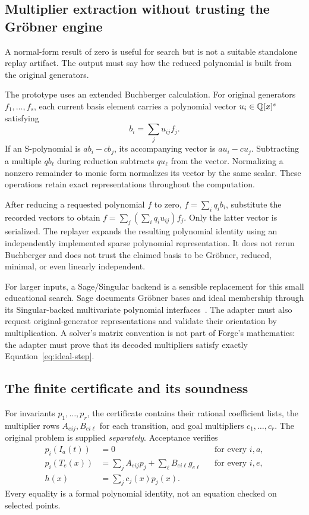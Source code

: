 \subsection{Multiplier extraction without trusting the Gr\"obner engine}

A normal-form result of zero is useful for search but is not a suitable
standalone replay artifact. The output must say how the reduced polynomial is
built from the original generators.

The prototype uses an extended Buchberger calculation. For original generators
$f_1,\ldots,f_s$, each current basis element carries a polynomial vector
$u_i\in\mathbb{Q}[x]^s$ satisfying
\[
 b_i=\sum_j u_{ij}f_j.
\]
If an S-polynomial is $a b_i-c b_j$, its accompanying vector is
$a u_i-c u_j$. Subtracting a multiple $q b_\ell$ during reduction subtracts
$q u_\ell$ from the vector. Normalizing a nonzero remainder to monic form
normalizes its vector by the same scalar. These operations retain exact
representations throughout the computation.

After reducing a requested polynomial $f$ to zero,
$f=\sum_i q_i b_i$, substitute the recorded vectors to obtain
$f=\sum_j(\sum_i q_i u_{ij})f_j$. Only the latter vector is serialized. The
replayer expands the resulting polynomial identity using an independently
implemented sparse polynomial representation. It does not rerun Buchberger and
does not trust the claimed basis to be Gr\"obner, reduced, minimal, or even
linearly independent.

For larger inputs, a Sage/Singular backend is a sensible replacement for this
small educational search. Sage documents Gr\"obner bases and ideal membership
through its Singular-backed multivariate polynomial interfaces~\cite{sage-ideals}.
The adapter must also request original-generator representations and validate
their orientation by multiplication. A solver's matrix convention is not part
of Forge's mathematics: the adapter must prove that its decoded multipliers
satisfy exactly Equation~\eqref{eq:ideal-step}.

\subsection{The finite certificate and its soundness}

For invariants $p_1,\ldots,p_r$, the certificate contains their rational
coefficient lists, the multiplier rows $A_{eij},B_{ei\ell}$ for each transition,
and goal multipliers $c_1,\ldots,c_r$. The original problem is supplied
\emph{separately}. Acceptance verifies
\begin{align}
 p_i(I_a(t))&=0 &&\text{for every }i,a,\label{eq:ideal-init-check}\\
 p_i(T_e(x))&=\sum_jA_{eij}p_j+\sum_\ell B_{ei\ell}g_{e\ell}
 &&\text{for every }i,e,\\
 h(x)&=\sum_jc_j(x)p_j(x).\label{eq:ideal-goal-check}
\end{align}
Every equality is a formal polynomial identity, not an equation checked on
selected points.

